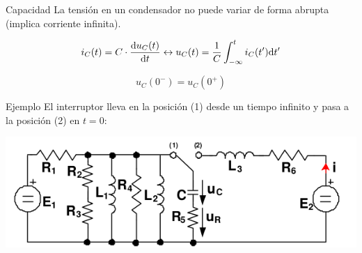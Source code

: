 \documentclass[aspectratio=169, xcolor={usenames,svgnames,dvipsnames}]{beamer}
\begin{document}
\begin{frame}[label={sec:orgfa4b458}]{Capacidad}
La tensión en un condensador no puede variar de forma abrupta (implica corriente infinita).

\[
i_C(t) = C \cdot \diff{u_C(t)}{t}
\leftrightarrow
u_C(t) = \frac{1}{C} \int^t_{-\infty}i_C(t') \mathrm{d}t'
\]

\[
\boxed{u_C(0^-) = u_C(0^+)}
\]
\end{frame}
\begin{frame}[label={sec:orgb62fbcb}]{Ejemplo}
El interruptor lleva en la posición (1) desde un tiempo infinito y  pasa a la posición (2) en \(t = 0\):
\begin{center}
\includegraphics[height=0.35\textheight]{figs/ejemplo_condiciones_iniciales.pdf}
\end{center}
\end{frame}
\end{document}
